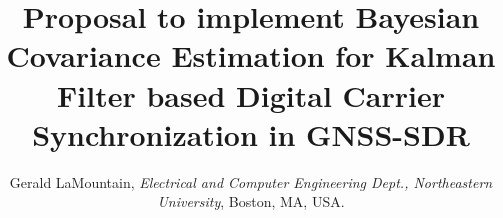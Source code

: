\documentclass{NSF}
\newcommand{\comment}[1] {{\color{red}$\blacktriangleright${#1}$\blacktriangleleft$}}
\begin{document}

\title{Proposal to implement Bayesian Covariance Estimation for Kalman Filter based Digital Carrier Synchronization in GNSS-SDR}
\author{Gerald LaMountain, \textit{Electrical and Computer Engineering Dept., Northeastern University}, Boston, MA, USA.}







\renewcommand\refname{References Cited}









% 

% 

% 


\end{document}
